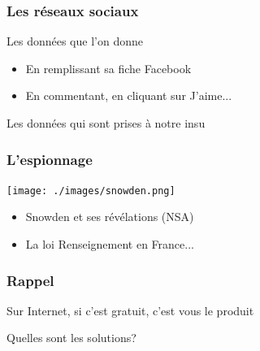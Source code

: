 \documentclass{beamer}
\begin{document}
\begin{frame}
\frametitle{Les réseaux sociaux}
\begin{block}{Les données que l'on donne}
\begin{itemize}
\item En remplissant sa fiche Facebook
\item En commentant, en cliquant sur J'aime...
\end{itemize}
\end{block}

\begin{block}{Les données qui sont prises à notre insu}
\begin{itemize}
\end{itemize}
\end{block}
\end{frame}

\begin{frame}
\frametitle{L'espionnage}

\begin{center}
\texttt{[image: ./images/snowden.png]}
\end{center}
\begin{itemize}
\item Snowden et ses révélations (NSA)
\item La loi Renseignement en France...
\end{itemize}
\end{frame}

\begin{frame}
\frametitle{Rappel}
\begin{center}
\Huge{Sur Internet, si c'est gratuit, c'est vous le produit }
\end{center}
\end{frame}

\begin{frame}
\begin{center}
\Huge{Quelles sont les solutions?}
\end{center}
\end{frame}
\end{document}
